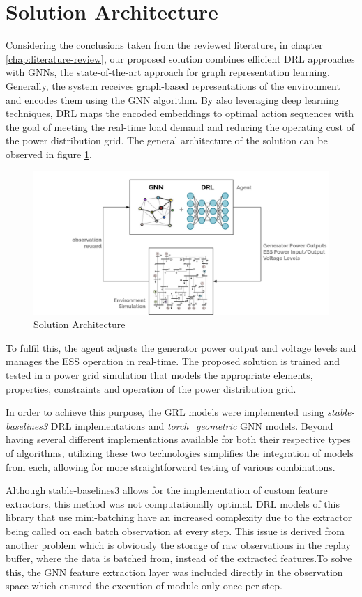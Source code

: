 \section{Solution Architecture} \label{sec:arch}

Considering the conclusions taken from the reviewed literature, in chapter \ref{chap:literature-review}, our proposed solution combines efficient \acf{DRL} approaches with \acfp{GNN}, the state-of-the-art approach for graph representation learning. Generally, the system receives graph-based representations of the environment and encodes them using the \ac{GNN} algorithm. By also leveraging deep learning techniques, \ac{DRL} maps the encoded embeddings to optimal action sequences with the goal of meeting the real-time load demand and reducing the operating cost of the power distribution grid. The general architecture of the solution can be observed in figure \ref{fig:arch}.

\begin{figure}
	\centering
	\includegraphics[width=0.85\linewidth]{./figures/arch.png}
	\caption{Solution Architecture}
	\label{fig:arch}
\end{figure}


To fulfil this, the agent adjusts the generator power output and voltage levels and manages the \ac{ESS} operation in real-time. The proposed solution is trained and tested in a power grid simulation that models the appropriate elements, properties, constraints and operation of the power distribution grid. \par
In order to achieve this purpose, the \ac{GRL} models were implemented using \textit{stable-baselines3} \ac{DRL} implementations and \textit{torch\_geometric} \ac{GNN} models. Beyond having several different implementations available for both their respective types of algorithms, utilizing these two technologies simplifies the integration of models from each, allowing for more straightforward testing of various combinations. \par
Although stable-baselines3 allows for the implementation of custom feature extractors, this method was not computationally optimal. \ac{DRL} models of this library that use mini-batching have an increased complexity due to the extractor being called on each batch observation at every step. This issue is derived from another problem which is obviously the storage of raw observations in the replay buffer, where the data is batched from, instead of the extracted features.To solve this, the \ac{GNN} feature extraction layer was included directly in the observation space which ensured the execution of module only once per step. \par



